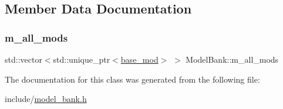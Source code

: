\subsection{Member Data Documentation}
\mbox{\label{classModelBank_afc89ca7d54b80aed8bc12fec3e584bf0}} 
\subsubsection{\texorpdfstring{m\+\_\+all\+\_\+mods}{m\_all\_mods}}
{\footnotesize\ttfamily std\+::vector$<$std\+::unique\+\_\+ptr$<$\hyperlink{classbase__mod}{base\+\_\+mod}$>$ $>$ Model\+Bank\+::m\+\_\+all\+\_\+mods\hspace{0.3cm}{\ttfamily [protected]}}



The documentation for this class was generated from the following file\+:\begin{DoxyCompactItemize}
\item 
include/\hyperlink{model__bank_8h}{model\+\_\+bank.\+h}\end{DoxyCompactItemize}
